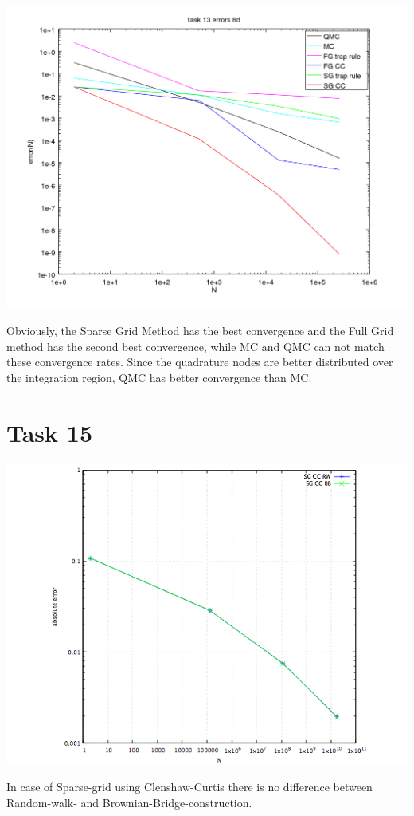 \documentclass[10pt,a4paper]{article}
\begin{document}
\begin{center}
\includegraphics[scale=0.5]{task_13_d8.png}
\end{center}
Obviously, the Sparse Grid Method has the best convergence and the Full
Grid method has the second best convergence, while MC and QMC can not match
these convergence rates. Since the quadrature nodes are better distributed over
the integration region, QMC has better convergence than MC.

\section*{Task 15}
\begin{center}
\includegraphics[scale=0.51]{task15.png}
\end{center}
In case of Sparse-grid using Clenshaw-Curtis there is no difference between Random-walk- and Brownian-Bridge-construction.
\end{document}
